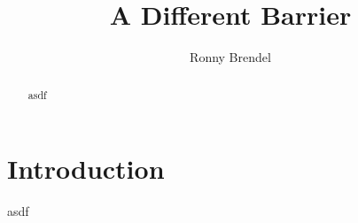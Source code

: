 \documentclass[a4paper, 10pt]{article}
\title{A Different Barrier}
\author{Ronny Brendel}
\begin{document}
\maketitle

\begin{abstract}
asdf\cite{PDSH}
\end{abstract}

\section{Introduction}
asdf

\nocite{*} %

{}
\end{document}
